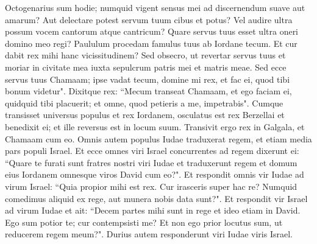 \begin{biblechapter}
\verse Octogenarius sum hodie; numquid vigent sensus mei ad discernendum suave aut amarum? Aut delectare potest servum tuum cibus et potus? Vel audire ultra possum vocem cantorum atque cantricum? Quare servus tuus esset ultra oneri domino meo regi? 
\verse Paululum procedam famulus tuus ab Iordane tecum. Et cur dabit rex mihi hanc vicissitudinem? 
\verse Sed obsecro, ut revertar servus tuus et moriar in civitate mea iuxta sepulcrum patris mei et matris meae. Sed ecce servus tuus Chamaam; ipse vadat tecum, domine mi rex, et fac ei, quod tibi bonum videtur". 
\verse Dixitque rex: “Mecum transeat Chamaam, et ego faciam ei, quidquid tibi placuerit; et omne, quod petieris a me, impetrabis". 
\verse Cumque transisset universus populus et rex Iordanem, osculatus est rex Berzellai et benedixit ei; et ille reversus est in locum suum. 
\verse Transivit ergo rex in Galgala, et Chamaam cum eo. Omnis autem populus Iudae traduxerat regem, et etiam media pars populi Israel. 
\verse Et ecce omnes viri Israel concurrentes ad regem dixerunt ei: “Quare te furati sunt fratres nostri viri Iudae et traduxerunt regem et domum eius Iordanem omnesque viros David cum eo?". 
\verse Et respondit omnis vir Iudae ad virum Israel: “Quia propior mihi est rex. Cur irasceris super hac re? Numquid comedimus aliquid ex rege, aut munera nobis data sunt?". 
\verse Et respondit vir Israel ad virum Iudae et ait: “Decem partes mihi sunt in rege et ideo etiam in David. Ego sum potior te; cur contempsisti me? Et non ego prior locutus sum, ut reducerem regem meum?". Durius autem responderunt viri Iudae viris Israel. 
\end{biblechapter}

